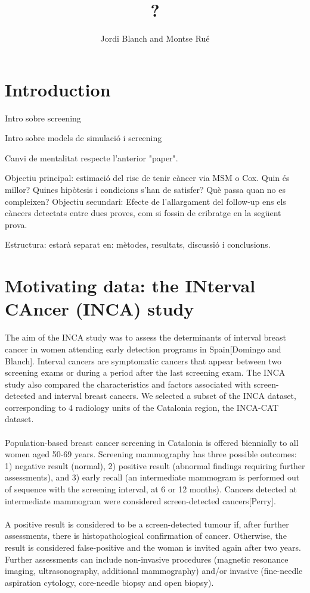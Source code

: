 \documentclass[10pt,a4paper]{article}
\author{Jordi Blanch and Montse Ru\'e}
\title{?}
\begin{document}
\section{Introduction}
Intro sobre screening

Intro sobre models de simulació i screening

Canvi de mentalitat respecte l'anterior "paper".

Objectiu principal: estimació del risc de tenir càncer via MSM o Cox. Quin és millor? Quines hipòtesis i condicions s'han de satisfer? Què passa quan no es compleixen? 
Objectiu secundari: Efecte de l'allargament del follow-up ens els càncers detectats entre dues proves, com si fossin de cribratge en la següent prova.

Estructura: estarà separat en: mètodes, resultats, discussió i conclusions.

\section{Motivating data: the INterval CAncer (INCA) study}
The aim of the INCA study was to assess the determinants of interval breast cancer in women
attending early detection programs in Spain[Domingo and Blanch]. Interval cancers are symptomatic
cancers that appear between two screening exams or during a period after the last screening exam.
The INCA study also compared the characteristics and factors associated with screen-detected and
interval breast cancers. We selected a subset of the INCA dataset, corresponding to 4 radiology 
units of the Catalonia region, the INCA-CAT dataset. 

\paragraph{}Population-based breast cancer screening in Catalonia is offered biennially to all
women aged 50-69 years. Screening mammography has three possible outcomes: 1) negative result
(normal), 2) positive result (abnormal findings requiring further assessments), and 3) early recall
(an intermediate mammogram is performed out of sequence with the screening interval, at 6 or 12
months). Cancers detected at intermediate mammogram were considered screen-detected cancers[Perry].

\paragraph{}A positive result is considered to be a screen-detected tumour if, after further
assessments, there is histopathological confirmation of cancer. Otherwise, the result is considered
false-positive and the woman is invited again after two years. Further assessments can include
non-invasive procedures (magnetic resonance imaging, ultrasonography, additional mammography) and/or
invasive (fine-needle aspiration cytology, core-needle biopsy and open biopsy). 
\end{document}
